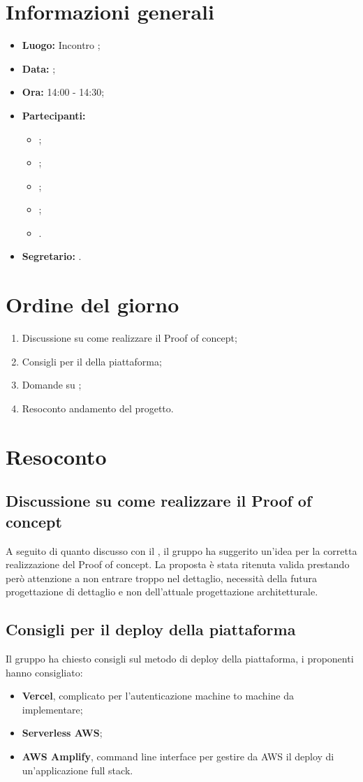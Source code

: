 \section{Informazioni generali}
\begin{itemize}
\item \textbf{Luogo:} Incontro ;
\item \textbf{Data:} \Data;
\item \textbf{Ora:} 14:00 - 14:30;
\item \textbf{Partecipanti:}
	\begin{itemize}
		\item \BL{}; 
		\item \FF{};
		\item \TG{};
		\item \TL{};
		\item \Proponente{}.
	\end{itemize}
\item \textbf{Segretario:} \TG{}.
\end{itemize}

\section{Ordine del giorno}
\begin{enumerate}
	\item Discussione su come realizzare il Proof of concept;
	\item Consigli per il  della piattaforma;
	\item Domande su ;
	\item Resoconto andamento del progetto.
\end{enumerate}

\section{Resoconto}
\subsection{Discussione su come realizzare il Proof of concept}
A seguito di quanto discusso con il \CR{}, il gruppo ha suggerito un'idea per la corretta realizzazione del Proof of concept. La proposta è stata ritenuta valida prestando però attenzione a non entrare troppo nel dettaglio, necessità della futura progettazione di dettaglio e non dell'attuale progettazione architetturale.
\subsection{Consigli per il deploy della piattaforma}
Il gruppo ha chiesto consigli sul metodo di deploy della piattaforma, i proponenti hanno consigliato:
\begin{itemize}
	\item \textbf{Vercel}, complicato per l'autenticazione machine to machine da implementare;
	\item \textbf{Serverless AWS};
	\item \textbf{AWS Amplify}, command line interface per gestire da AWS il deploy di un'applicazione full stack.
\end{itemize}
